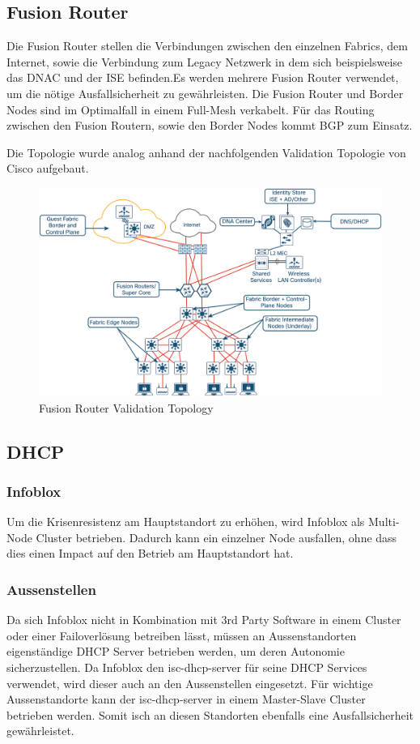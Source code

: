 \subsection{Fusion Router}
Die Fusion Router stellen die Verbindungen zwischen den einzelnen Fabrics, dem Internet, sowie die Verbindung zum Legacy Netzwerk in dem sich beispielsweise das DNAC und der ISE befinden.Es werden mehrere Fusion Router verwendet, um die nötige Ausfallsicherheit zu gewährleisten. Die Fusion Router und Border Nodes sind im Optimalfall in einem Full-Mesh verkabelt. Für das Routing zwischen den Fusion Routern, sowie den Border Nodes kommt BGP zum Einsatz.

Die Topologie wurde analog anhand der nachfolgenden Validation Topologie von Cisco aufgebaut.
\begin{figure}[H]
	\centering
	\includegraphics[width=1\linewidth]{img/Absicherung/FusionRouter-ValidationTopology}
	\caption{Fusion Router Validation Topology \cite{sda-deploymentguide-oct2018} }
	\label{fig:Fusion Router Validation Topology}
\end{figure}


\subsection{DHCP}

\subsubsection{Infoblox}
Um die Krisenresistenz am Hauptstandort zu erhöhen, wird Infoblox als Multi-Node Cluster betrieben. Dadurch kann ein einzelner Node ausfallen, ohne dass dies einen Impact auf den Betrieb am Hauptstandort hat. 

\subsubsection{Aussenstellen}
Da sich Infoblox nicht in Kombination mit 3rd Party Software in einem Cluster oder einer Failoverlösung betreiben lässt, müssen an Aussenstandorten eigenständige DHCP Server betrieben werden, um deren Autonomie sicherzustellen. Da Infoblox den isc-dhcp-server für seine DHCP Services verwendet, wird dieser auch an den Aussenstellen eingesetzt. 
Für wichtige Aussenstandorte kann der isc-dhcp-server in einem Master-Slave Cluster betrieben werden. Somit isch an diesen Standorten ebenfalls eine Ausfallsicherheit gewährleistet.

